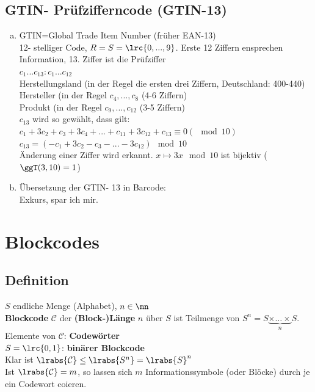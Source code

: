   \subsection{GTIN- Prüfzifferncode (GTIN-13)}
    \begin{enumerate}[a)]
      \item GTIN=Global Trade Item Number (früher EAN-13)\\
        12- stelliger Code, $R=S=\lrc{0,...,9}$. Erste 12 Ziffern ensprechen
        Information, 13. Ziffer ist die Prüfziffer\\
        $c_1...c_{13}:c_1...c_{12}$\\
        Herstellungsland (in der Regel die ersten drei Ziffern, Deutschland:
        400-440)\\
        Hersteller (in der Regel $c_4,...,c_8$ (4-6 Ziffern)\\
        Produkt (in der Regel $c_9,...,c_{12}$ (3-5 Ziffern)\\
        $c_{13}$ wird so gewählt, dass gilt:
        $c_1+3c_2+c_3+3c_4+...+c_{11}+3c_{12}+c_{13}\equiv 0(\mod 10)$\\
        $c_{13}=(-c_1+3c_2-c_3-...-3c_12)\mod 10$\\
        Änderung einer Ziffer wird erkannt. $x\mapsto 3x\mod 10$ ist bijektiv
        ($\ggT(3,10)=1$)
      \item Übersetzung der GTIN- 13 in Barcode:\\
        Exkurs, spar ich mir.
    \end{enumerate}

\section{Blockcodes}
	\subsection{Definition}
		$S$ endliche Menge (Alphabet), $n\in\mn$\\
		\textbf{Blockcode} $\mathcal{C}$ der \textbf{(Block-)Länge} $n$ über $S$ ist Teilmenge von $S^n=S\underbrace{\times\dots\times}_{n}S$.\\
		Elemente von $\mathcal{C}$: \textbf{Codewörter}\\
		$S=\lrc{0,1}$: \textbf{binärer Blockcode}\\
		Klar ist $\lrabs{\mathcal{C}}\leq\lrabs{S^n}=\lrabs{S}^n$\\
		Ist $\lrabs{\mathcal{C}}=m$, so lassen sich $m$ Informationssymbole (oder Blöcke) durch je ein Codewort coieren.
	
